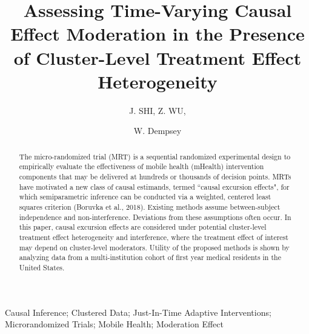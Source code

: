 \documentclass[lineno]{biometrika}
\begin{document}



\title{Assessing Time-Varying Causal Effect Moderation in the Presence of Cluster-Level Treatment Effect Heterogeneity}

\author{J. SHI, Z. WU, \and W. Dempsey}

\maketitle

\begin{abstract}
The micro-randomized trial (MRT) is a sequential randomized experimental design to empirically evaluate the effectiveness of mobile health (mHealth) intervention components that may be delivered at hundreds or thousands of decision points. MRTs have motivated a new class of causal estimands, termed ``causal excursion effects", for which semiparametric inference can be conducted via  a weighted, centered least squares criterion (Boruvka et al., 2018). Existing methods assume between-subject independence and non-interference. Deviations from these assumptions often occur.
In this paper, causal excursion effects are considered under potential cluster-level treatment effect heterogeneity and interference, where the treatment effect of interest may depend on cluster-level moderators. Utility of the proposed methods is shown by analyzing data from a multi-institution cohort of first year medical residents in the United States. 
\end{abstract}

\begin{keywords}
Causal Inference; Clustered Data; Just-In-Time Adaptive Interventions; Microrandomized Trials; Mobile Health; Moderation Effect
\end{keywords}
\end{document}
